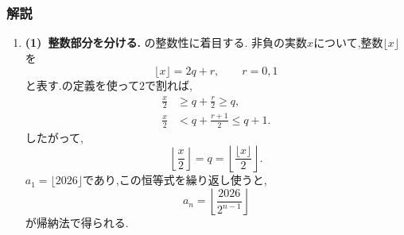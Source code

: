       \subsubsection{解説}\label{節：発展パターン・特殊性質型の演習：解法}
        \begin{enumerate}[label=\textbf{問\arabic*.},leftmargin=3.8em,format=\bookitemlink{practice-special}{solution}{problem}]
          \item \textbf{(1)~整数部分を分ける.}
                の整数性に着目する.
                非負の実数$\displaystyle x$について,整数$\displaystyle \lfloor x\rfloor$を
                \[
                  \lfloor x\rfloor=2q+r,\qquad r=0,1
                \]
                と表す.の定義を使って$\displaystyle 2$で割れば,
                \begin{align*}
                  \frac x2&\ge q+\frac r2\ge q,\\
                  \frac x2&<q+\frac{r+1}{2}\le q+1.
                \end{align*}
                したがって,
                \[
                  \left\lfloor\frac{x}{2}\right\rfloor=q
                    =\left\lfloor\frac{\lfloor x\rfloor}{2}\right\rfloor.
                \]
                $\displaystyle a_1=\lfloor2026\rfloor$であり,この恒等式を繰り返し使うと,
                \[
                  a_n=\left\lfloor\frac{2026}{2^{n-1}}\right\rfloor
                \]
                が帰納法で得られる.


\end{enumerate}

